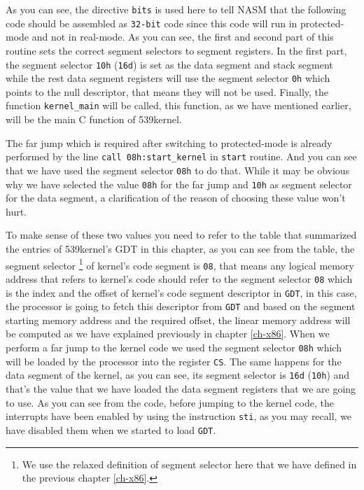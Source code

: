 As you can see, the directive \lstinline!bits! is used here to tell NASM
that the following code should be assembled as \lstinline!32-bit! code
since this code will run in protected-mode and not in real-mode. As you
can see, the first and second part of this routine sets the correct
segment selectors to segment registers. In the first part, the segment
selector \lstinline!10h! (\lstinline!16d!) is set as the data segment
and stack segment while the rest data segment registers will use the
segment selector \lstinline!0h! which points to the null descriptor,
that means they will not be used. Finally, the function
\lstinline!kernel_main! will be called, this function, as we have
mentioned earlier, will be the main C function of 539kernel.

The far jump which is required after switching to protected-mode is
already performed by the line \lstinline!call 08h:start_kernel! in
\lstinline!start! routine. And you can see that we have used the segment
selector \lstinline!08h! to do that. While it may be obvious why we have
selected the value \lstinline!08h! for the far jump and \lstinline!10h!
as segment selector for the data segment, a clarification of the reason
of choosing these value won't hurt.

To make sense of these two values you need to refer to the table that
summarized the entries of 539kernel's GDT in this chapter, as you can
see from the table, the segment selector \footnote{We use the relaxed
  definition of segment selector here that we have defined in the
  previous chapter \ref{ch-x86}.} of kernel's code segment is
\lstinline!08!, that means any logical memory address that refers to
kernel's code should refer to the segment selector \lstinline!08! which
is the index and the offset of kernel's code segment descriptor in
\lstinline!GDT!, in this case, the processor is going to fetch this
descriptor from \lstinline!GDT! and based on the segment starting memory
address and the required offset, the linear memory address will be
computed as we have explained previously in chapter \ref{ch-x86}. When
we perform a far jump to the kernel code we used the segment selector
\lstinline!08h! which will be loaded by the processor into the register
\lstinline!CS!. The same happens for the data segment of the kernel, as
you can see, its segment selector is \lstinline!16d! (\lstinline!10h!)
and that's the value that we have loaded the data segment registers that
we are going to use. As you can see from the code, before jumping to the
kernel code, the interrupts have been enabled by using the instruction
\lstinline!sti!, as you may recall, we have disabled them when we
started to load \lstinline!GDT!.

